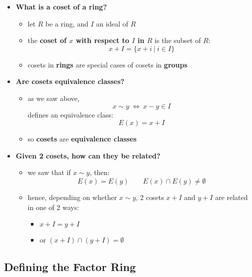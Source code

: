 \documentclass{exam}
\begin{document}
\begin{itemize}
    \item \textbf{What is a coset of a ring?}
    \begin{itemize}
        \item let $R$ be a ring, and $I$ an ideal of $R$
        \item the \textbf{coset of $x$ with respect to $I$ in $R$} is the subset of $R$:
        \[
        x + I = \{x + i \ | \ i \in I\}
        \]
        \item cosets in \textbf{rings} are special cases of cosets in \textbf{groups}
    \end{itemize}
    \item \textbf{Are cosets equivalence classes?}
    \begin{itemize}
        \item as we saw above,
        \[
        x \sim y \ \iff \ x - y \in I
        \]
        defines an equivalence class:
        \[
        E(x) = x + I
        \]
        \item so \textbf{cosets} are \textbf{equivalence classes}
    \end{itemize}
    \item \textbf{Given 2 cosets, how can they be related?}
    \begin{itemize}
        \item we saw that if $x \sim y$, then:
        \[
        E(x) = E(y) \qquad E(x) \cap E(y) \neq \emptyset
        \]
        \item hence, depending on whether $x \sim y$, 2 cosets $x + I$ and $y + I$ are related in one of 2 ways:
        \begin{itemize}
            \item $x + I = y + I$
            \item or $(x + I) \cap (y+I) = \emptyset$
        \end{itemize}
    \end{itemize}
\end{itemize}

\subsection{Defining the Factor Ring}
\end{document}
